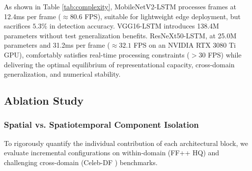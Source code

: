 \begin{table}[ht]
    \centering
    \caption{Computational Complexity and Inference Efficiency ($\text{Mean} \pm \text{Std Dev}$)}
    \label{tab:complexity}
    \par{}
\end{table}

As shown in Table \ref{tab:complexity}, MobileNetV2-LSTM processes frames at 12.4ms per frame ($\approx 80.6$ FPS), suitable for lightweight edge deployment, but sacrifices $5.3\%$ in detection accuracy. VGG16-LSTM introduces 138.4M parameters without test generalization benefits. ResNeXt50-LSTM, at 25.0M parameters and 31.2ms per frame ($\approx 32.1$ FPS on an NVIDIA RTX 3080 Ti GPU), comfortably satisfies real-time processing constraints ($>30$ FPS) while delivering the optimal equilibrium of representational capacity, cross-domain generalization, and numerical stability.

\subsection{Ablation Study}

\subsubsection{Spatial vs. Spatiotemporal Component Isolation}
To rigorously quantify the individual contribution of each architectural block, we evaluate incremental configurations on within-domain (FF++ HQ) and challenging cross-domain (Celeb-DF \citep{Celeb_DF_cvpr20}) benchmarks.

